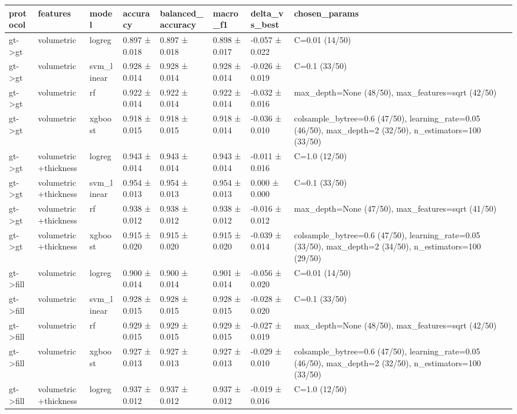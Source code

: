 \begin{tabular}{llllllll}
\toprule
protocol & features & model & accuracy & balanced\_accuracy & macro\_f1 & delta\_vs\_best & chosen\_params \\
\midrule
gt->gt & volumetric & logreg & 0.897 ± 0.018 & 0.897 ± 0.018 & 0.898 ± 0.017 & -0.057 ± 0.022 & C=0.01 (14/50) \\
gt->gt & volumetric & svm\_linear & 0.928 ± 0.014 & 0.928 ± 0.014 & 0.928 ± 0.014 & -0.026 ± 0.019 & C=0.1 (33/50) \\
gt->gt & volumetric & rf & 0.922 ± 0.014 & 0.922 ± 0.014 & 0.922 ± 0.014 & -0.032 ± 0.016 & max\_depth=None (48/50), max\_features=sqrt (42/50) \\
gt->gt & volumetric & xgboost & 0.918 ± 0.015 & 0.918 ± 0.015 & 0.918 ± 0.014 & -0.036 ± 0.010 & colsample\_bytree=0.6 (47/50), learning\_rate=0.05 (46/50), max\_depth=2 (32/50), n\_estimators=100 (33/50) \\
gt->gt & volumetric+thickness & logreg & 0.943 ± 0.014 & 0.943 ± 0.014 & 0.943 ± 0.014 & -0.011 ± 0.016 & C=1.0 (12/50) \\
gt->gt & volumetric+thickness & svm\_linear & 0.954 ± 0.013 & 0.954 ± 0.013 & 0.954 ± 0.013 & 0.000 ± 0.000 & C=0.1 (33/50) \\
gt->gt & volumetric+thickness & rf & 0.938 ± 0.012 & 0.938 ± 0.012 & 0.938 ± 0.012 & -0.016 ± 0.012 & max\_depth=None (47/50), max\_features=sqrt (41/50) \\
gt->gt & volumetric+thickness & xgboost & 0.915 ± 0.020 & 0.915 ± 0.020 & 0.915 ± 0.020 & -0.039 ± 0.014 & colsample\_bytree=0.6 (47/50), learning\_rate=0.05 (33/50), max\_depth=2 (34/50), n\_estimators=100 (29/50) \\
gt->fill & volumetric & logreg & 0.900 ± 0.014 & 0.900 ± 0.014 & 0.901 ± 0.014 & -0.056 ± 0.020 & C=0.01 (14/50) \\
gt->fill & volumetric & svm\_linear & 0.928 ± 0.015 & 0.928 ± 0.015 & 0.928 ± 0.015 & -0.028 ± 0.020 & C=0.1 (33/50) \\
gt->fill & volumetric & rf & 0.929 ± 0.015 & 0.929 ± 0.015 & 0.929 ± 0.015 & -0.027 ± 0.019 & max\_depth=None (48/50), max\_features=sqrt (42/50) \\
gt->fill & volumetric & xgboost & 0.927 ± 0.013 & 0.927 ± 0.013 & 0.927 ± 0.013 & -0.029 ± 0.010 & colsample\_bytree=0.6 (47/50), learning\_rate=0.05 (46/50), max\_depth=2 (32/50), n\_estimators=100 (33/50) \\
gt->fill & volumetric+thickness & logreg & 0.937 ± 0.012 & 0.937 ± 0.012 & 0.937 ± 0.012 & -0.019 ± 0.016 & C=1.0 (12/50) \\

\end{tabular}
